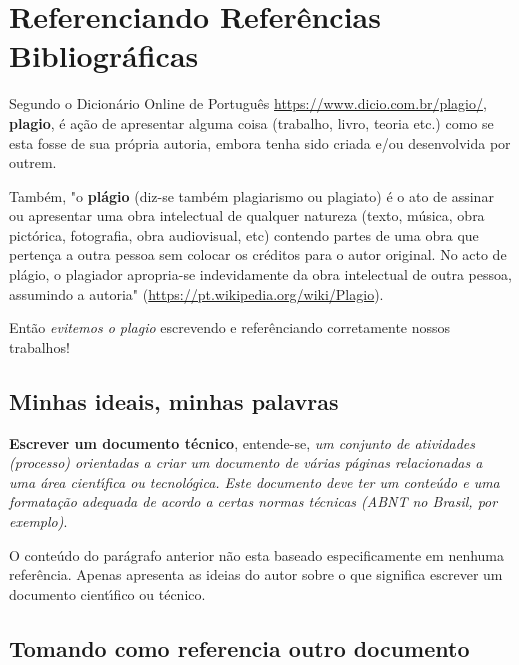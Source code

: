


\section{Referenciando Refer\^{e}ncias Bibliogr\'{a}ficas}

Segundo o Dicion\'{a}rio Online de Portugu\^{e}s \url{https://www.dicio.com.br/plagio/}, \textbf{plagio}, \'{e} a\c{c}\~{a}o de apresentar alguma coisa (trabalho, livro, teoria etc.) como se esta fosse de sua pr\'{o}pria autoria, embora tenha sido criada e/ou desenvolvida por outrem.

Tamb\'{e}m, "o \textbf{pl\'{a}gio} (diz-se tamb\'{e}m plagiarismo ou plagiato) \'{e} o ato de assinar ou apresentar uma obra intelectual de qualquer natureza (texto, m\'{u}sica, obra pict\'{o}rica, fotografia, obra audiovisual, etc) contendo partes de uma obra que perten\c{c}a a outra pessoa sem colocar os cr\'{e}ditos para o autor original. No acto de pl\'{a}gio, o plagiador apropria-se indevidamente da obra intelectual de outra pessoa, assumindo a autoria" (\url{https://pt.wikipedia.org/wiki/Plagio}).

Ent\~{a}o \textit{evitemos o plagio} escrevendo e refer\^{e}nciando corretamente nossos trabalhos!


\subsection{Minhas ideais, minhas palavras}

 \textbf{Escrever um documento t\'{e}cnico}, entende-se, \textit{um conjunto de atividades (processo) orientadas a criar um documento de v\'{a}rias p\'{a}ginas relacionadas a uma \'{a}rea cient\'{\i}fica ou tecnol\'{o}gica. Este documento deve ter um conte\'{u}do e  uma formata\c{c}\~{a}o adequada de acordo a certas normas t\'{e}cnicas (ABNT no Brasil, por exemplo)}.

 O conte\'{u}do do par\'{a}grafo anterior n\~{a}o esta baseado especificamente em nenhuma refer\^{e}ncia. Apenas apresenta as ideias do autor sobre o que significa escrever um documento cient\'{\i}fico ou t\'{e}cnico.


\subsection{Tomando como referencia outro documento}

